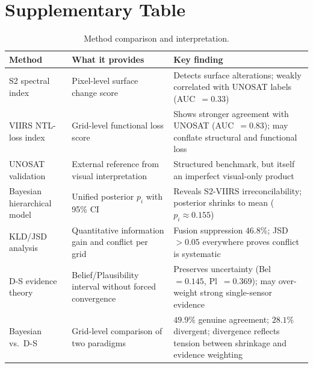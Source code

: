 \documentclass[wcp]{jmlr}
\begin{document}



\appendix

\section{Supplementary Table}\label{apd:tables}

\begin{table}[htp]
\centering
\caption{Method comparison and interpretation.}
\label{tab:methods}
\begin{tabular}{@{}lp{4.5cm}p{5.5cm}@{}}
\toprule
\textbf{Method} & \textbf{What it provides} &
  \textbf{Key finding} \\
\midrule
S2 spectral index &
  Pixel-level surface change score &
  Detects surface alterations; weakly correlated with UNOSAT labels
  (AUC~$=0.33$) \\
VIIRS NTL-loss index &
  Grid-level functional loss score &
  Shows stronger agreement with UNOSAT (AUC~$=0.83$); may conflate
  structural and functional loss \\
UNOSAT validation &
  External reference from visual interpretation &
  Structured benchmark, but itself an imperfect visual-only product \\
Bayesian hierarchical model &
  Unified posterior $p_i$ with 95\% CI &
  Reveals S2-VIIRS irreconcilability; posterior shrinks to mean
  ($p_i \approx 0.155$) \\
KLD/JSD analysis &
  Quantitative information gain and conflict per grid &
  Fusion suppression $46.8\%$; JSD $>0.05$ everywhere proves conflict is
  systematic \\
D-S evidence theory &
  Belief/Plausibility interval without forced convergence &
  Preserves uncertainty (Bel~$=0.145$, Pl~$=0.369$); may over-weight
  strong single-sensor evidence \\
Bayesian vs.\ D-S &
  Grid-level comparison of two paradigms &
  $49.9\%$ genuine agreement; $28.1\%$ divergent; divergence reflects
  tension between shrinkage and evidence weighting \\
\bottomrule
\end{tabular}
\end{table}
\end{document}
